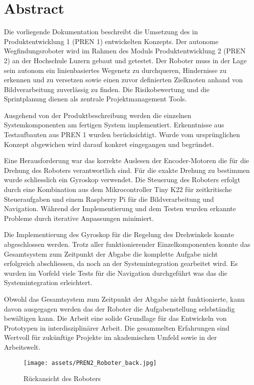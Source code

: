 \section*{Abstract}


Die vorliegende Dokumentation beschreibt die Umsetzung des in Produktentwicklung 1 (PREN 1) entwickelten Konzepts. Der autonome Wegfindungsroboter wird im Rahmen des Moduls Produktentwicklung 2 (PREN 2) an der Hochschule Luzern gebaut und getestet. Der Roboter muss in der Lage sein autonom ein linienbasiertes Wegenetz zu durchqueren, Hindernisse zu erkennen und zu versetzen sowie einen zuvor definierten Zielknoten anhand von Bildverarbeitung zuverlässig zu finden. Die Risikobewertung und die Sprintplanung dienen als zentrale Projektmanagement Tools.  

Ausgehend von der Produktbeschreibung werden die einzelnen Systemkomponenten am fertigen System implementiert. Erkenntnisse aus Testaufbauten aus PREN 1 wurden berücksichtigt. Wurde vom ursprünglichen Konzept abgewichen wird darauf konkret eingegangen und begründet. 

Eine Herausforderung war das korrekte Auslesen der Encoder-Motoren die für die Drehung des Roboters verantwortlich sind. Für die exakte Drehung zu bestimmen wurde schliesslich ein Gyroskop verwendet. Die Steuerung des Roboters erfolgt durch eine Kombination aus dem Mikrocontroller Tiny K22 für zeitkritische Steueraufgaben und einem Raspberry Pi für die Bildverarbeitung und Navigation. Während der Implementierung und dem Testen wurden erkannte Probleme durch iterative Anpassungen minimiert.


Die Implementierung des Gyroskop für die Regelung des Drehwinkels konnte abgeschlossen werden. Trotz aller funktionierender Einzelkomponenten konnte das Gesamtsystem zum Zeitpunkt der Abgabe die komplette Aufgabe nicht erfolgreich abschliessen, da noch an der Systemintegration gearbeitet wird. Es wurden im Vorfeld viele Tests für die Navigation durchgeführt was das die Systemintegration erleichtert.

Obwohl das Gesamtsystem zum Zeitpunkt der Abgabe nicht funktionierte, kann davon ausgegagen werden das der Roboter die Aufgabenstellung selsbständig bewältigen kann. Die Arbeit eine solide Grundlage für das Entwickeln von Prototypen in interdisziplinärer Arbeit. Die gesammelten Erfahrungen sind Wertvoll für zukünftige Projekte im akademischen Umfeld sowie in der Arbeitswelt.


\begin{figure}[h]
    \centering
    \texttt{[image: assets/PREN2\_Roboter\_back.jpg]}
    \caption{Rückansicht des Roboters}
    \label{fig:roboter_back}
\end{figure}


